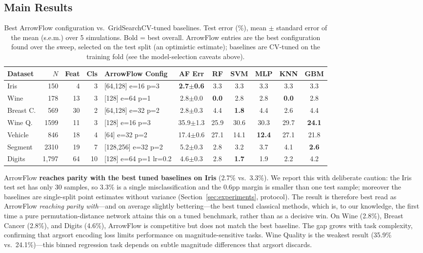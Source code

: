 \documentclass[12pt]{article}
\begin{document}
\subsection{Main Results}

\begin{table}[ht]
\centering
\caption{Best ArrowFlow configuration vs.\ GridSearchCV-tuned baselines. Test error (\%), mean $\pm$ standard error of the mean (s.e.m.) over 5 simulations. Bold = best overall. ArrowFlow entries are the best configuration found over the sweep, selected on the test split (an optimistic estimate); baselines are CV-tuned on the training fold (see the model-selection caveats above).}
\label{tab:uci-main}
\footnotesize
\begin{tabular}{lrrrlcccccc}
\toprule
Dataset & $N$ & Feat & Cls & ArrowFlow Config & AF Err & RF & SVM & MLP & KNN & GBM \\
\midrule
Iris & 150 & 4 & 3 & {[64,128] e=16 p=3} & \textbf{2.7\tiny{$\pm$0.6}} & 3.3 & 3.3 & 3.3 & 3.3 & 3.3 \\
Wine & 178 & 13 & 3 & {[128] e=64 p=1} & 2.8\tiny{$\pm$0.0} & \textbf{0.0} & 2.8 & 2.8 & \textbf{0.0} & 2.8 \\
Breast C. & 569 & 30 & 2 & {[64,128] e=32 p=2} & 2.8\tiny{$\pm$0.3} & 4.4 & \textbf{1.8} & 4.4 & 2.6 & 4.4 \\
Wine Q. & 1599 & 11 & 3 & {[128] e=16 p=3} & 35.9\tiny{$\pm$1.3} & 25.9 & 30.6 & 30.3 & 29.7 & \textbf{24.1} \\
Vehicle & 846 & 18 & 4 & {[64] e=32 p=2} & 17.4\tiny{$\pm$0.6} & 27.1 & 14.1 & \textbf{12.4} & 27.1 & 21.8 \\
Segment & 2310 & 19 & 7 & {[128,256] e=32 p=2} & 5.2\tiny{$\pm$0.3} & 2.8 & 3.2 & 3.7 & 4.1 & \textbf{2.6} \\
Digits & 1{,}797 & 64 & 10 & {[128] e=64 p=1 lr=0.2} & 4.6\tiny{$\pm$0.3} & 2.8 & \textbf{1.7} & 1.9 & 2.2 & 4.2 \\
\bottomrule
\end{tabular}
\end{table}

ArrowFlow \textbf{reaches parity with the best tuned baselines on Iris} (2.7\% vs.\ 3.3\%). We report this with deliberate caution: the Iris test set has only 30 samples, so 3.3\% is a single misclassification and the 0.6pp margin is smaller than one test sample; moreover the baselines are single-split point estimates without variance (Section~\ref{sec:experiments}, protocol). The result is therefore best read as ArrowFlow \emph{reaching parity with}---and on average slightly bettering---the best tuned classical methods, which is, to our knowledge, the first time a pure permutation-distance network attains this on a tuned benchmark, rather than as a decisive win. On Wine (2.8\%), Breast Cancer (2.8\%), and Digits (4.6\%), ArrowFlow is competitive but does not match the best baseline. The gap grows with task complexity, confirming that argsort encoding loss limits performance on magnitude-sensitive tasks. Wine Quality is the weakest result (35.9\% vs.\ 24.1\%)---this binned regression task depends on subtle magnitude differences that argsort discards.
\end{document}
